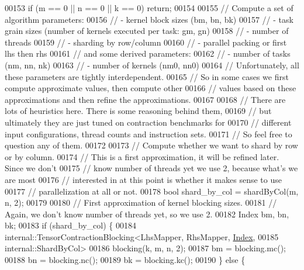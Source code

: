 \begin{DoxyCode}
00153     \textcolor{keywordflow}{if} (m == 0 || n == 0 || k == 0) \textcolor{keywordflow}{return};
00154 
00155     \textcolor{comment}{// Compute a set of algorithm parameters:}
00156     \textcolor{comment}{// - kernel block sizes (bm, bn, bk)}
00157     \textcolor{comment}{// - task grain sizes (number of kernels executed per task: gm, gn)}
00158     \textcolor{comment}{// - number of threads}
00159     \textcolor{comment}{// - sharding by row/column}
00160     \textcolor{comment}{// - parallel packing or first lhs then rhs}
00161     \textcolor{comment}{// and some derived parameters:}
00162     \textcolor{comment}{// - number of tasks (nm, nn, nk)}
00163     \textcolor{comment}{// - number of kernels (nm0, nn0)}
00164     \textcolor{comment}{// Unfortunately, all these parameters are tightly interdependent.}
00165     \textcolor{comment}{// So in some cases we first compute approximate values, then compute other}
00166     \textcolor{comment}{// values based on these approximations and then refine the approximations.}
00167 
00168     \textcolor{comment}{// There are lots of heuristics here. There is some reasoning behind them,}
00169     \textcolor{comment}{// but ultimately they are just tuned on contraction benchmarks for}
00170     \textcolor{comment}{// different input configurations, thread counts and instruction sets.}
00171     \textcolor{comment}{// So feel free to question any of them.}
00172 
00173     \textcolor{comment}{// Compute whether we want to shard by row or by column.}
00174     \textcolor{comment}{// This is a first approximation, it will be refined later. Since we don't}
00175     \textcolor{comment}{// know number of threads yet we use 2, because what's we are most}
00176     \textcolor{comment}{// interested in at this point is whether it makes sense to use}
00177     \textcolor{comment}{// parallelization at all or not.}
00178     \textcolor{keywordtype}{bool} shard\_by\_col = shardByCol(m, n, 2);
00179 
00180     \textcolor{comment}{// First approximation of kernel blocking sizes.}
00181     \textcolor{comment}{// Again, we don't know number of threads yet, so we use 2.}
00182     Index bm, bn, bk;
00183     \textcolor{keywordflow}{if} (shard\_by\_col) \{
00184       internal::TensorContractionBlocking<LhsMapper, RhsMapper, \hyperlink{namespace_eigen_a62e77e0933482dafde8fe197d9a2cfde}{Index},
00185                                           internal::ShardByCol>
00186           blocking(k, m, n, 2);
00187       bm = blocking.mc();
00188       bn = blocking.nc();
00189       bk = blocking.kc();
00190     \} \textcolor{keywordflow}{else} \{

\end{DoxyCode}
